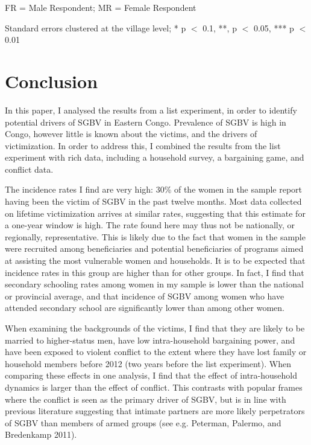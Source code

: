 \documentclass[
]{article}
\begin{document}
FR = Male Respondent; MR = Female Respondent

Standard errors clustered at the village level; * p \(<\) 0.1, **, p
\(<\) 0.05, *** p \(<\) 0.01

\section*{Conclusion}\label{conclusion}

In this paper, I analysed the results from a list experiment, in order
to identify potential drivers of SGBV in Eastern Congo. Prevalence of
SGBV is high in Congo, however little is known about the victims, and
the drivers of victimization. In order to address this, I combined the
results from the list experiment with rich data, including a household
survey, a bargaining game, and conflict data.

The incidence rates I find are very high: 30\% of the women in the
sample report having been the victim of SGBV in the past twelve months.
Most data collected on lifetime victimization arrives at similar rates,
suggesting that this estimate for a one-year window is high. The rate
found here may thus not be nationally, or regionally, representative.
This is likely due to the fact that women in the sample were recruited
among beneficiaries and potential beneficiaries of programs aimed at
assisting the most vulnerable women and households. It is to be expected
that incidence rates in this group are higher than for other groups. In
fact, I find that secondary schooling rates among women in my sample is
lower than the national or provincial average, and that incidence of
SGBV among women who have attended secondary school are significantly
lower than among other women.

When examining the backgrounds of the victims, I find that they are
likely to be married to higher-status men, have low intra-household
bargaining power, and have been exposed to violent conflict to the
extent where they have lost family or household members before 2012 (two
years before the list experiment). When comparing these effects in one
analysis, I find that the effect of intra-household dynamics is larger
than the effect of conflict. This contrasts with popular frames where
the conflict is seen as the primary driver of SGBV, but is in line with
previous literature suggesting that intimate partners are more likely
perpetrators of SGBV than members of armed groups (see e.g. Peterman,
Palermo, and Bredenkamp 2011).
\end{document}
